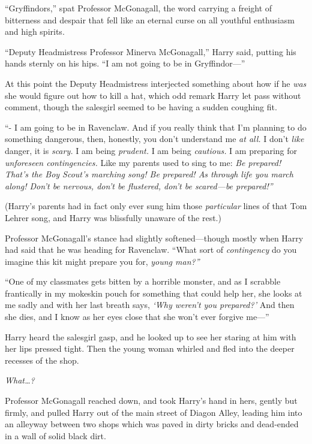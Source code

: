 ``Gryffindors,'' spat Professor McGonagall, the word carrying a freight
of bitterness and despair that fell like an eternal curse on all
youthful enthusiasm and high spirits.

``Deputy Headmistress Professor Minerva McGonagall,'' Harry said,
putting his hands sternly on his hips. ``I am not going to be in
Gryffindor---''

At this point the Deputy Headmistress interjected something about how if
he \emph{was} she would figure out how to kill a hat, which odd remark
Harry let pass without comment, though the salesgirl seemed to be having
a sudden coughing fit.

``- I am going to be in Ravenclaw. And if you really think that I'm
planning to do something dangerous, then, honestly, you don't understand
me \emph{at all.} I don't \emph{like} danger, it is \emph{scary.} I am
being \emph{prudent.} I am being \emph{cautious.} I am preparing for
\emph{unforeseen contingencies.} Like my parents used to sing to me:
\emph{Be prepared! That's the Boy Scout's marching song! Be prepared! As
through life you march along! Don't be nervous, don't be flustered,
don't be scared---be prepared!''}

(Harry's parents had in fact only ever sung him those \emph{particular}
lines of that Tom Lehrer song, and Harry was blissfully unaware of the
rest.)

Professor McGonagall's stance had slightly softened---though mostly when
Harry had said that he was heading for Ravenclaw. ``What sort of
\emph{contingency} do you imagine this kit might prepare you for,
\emph{young man?''}

``One of my classmates gets bitten by a horrible monster, and as I
scrabble frantically in my mokeskin pouch for something that could help
her, she looks at me sadly and with her last breath says, \emph{`Why
weren't you prepared?'} And then she dies, and I know as her eyes close
that she won't ever forgive me---''

Harry heard the salesgirl gasp, and he looked up to see her staring at
him with her lips pressed tight. Then the young woman whirled and fled
into the deeper recesses of the shop.

\emph{What\ldots{}?}

Professor McGonagall reached down, and took Harry's hand in hers, gently
but firmly, and pulled Harry out of the main street of Diagon Alley,
leading him into an alleyway between two shops which was paved in dirty
bricks and dead-ended in a wall of solid black dirt.

